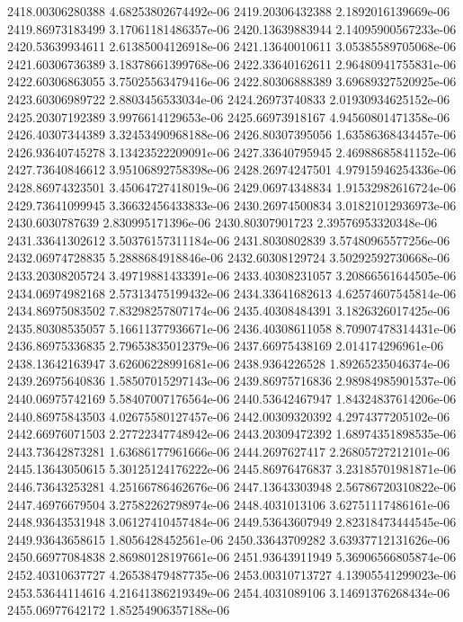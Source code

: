 {2418.00306280388 4.68253802674492e-06
2419.20306432388 2.1892016139669e-06
2419.86973183499 3.17061181486357e-06
2420.13639883944 2.14095900567233e-06
2420.53639934611 2.61385004126918e-06
2421.13640010611 3.05385589705068e-06
2421.60306736389 3.18378661399768e-06
2422.33640162611 2.96480941755831e-06
2422.60306863055 3.75025563479416e-06
2422.80306888389 3.69689327520925e-06
2423.60306989722 2.8803456533034e-06
2424.26973740833 2.01930934625152e-06
2425.20307192389 3.9976614129653e-06
2425.66973918167 4.94560801471358e-06
2426.40307344389 3.32453490968188e-06
2426.80307395056 1.63586368434457e-06
2426.93640745278 3.13423522209091e-06
2427.33640795945 2.46988685841152e-06
2427.73640846612 3.95106892758398e-06
2428.26974247501 4.97915946254336e-06
2428.86974323501 3.45064727418019e-06
2429.06974348834 1.91532982616724e-06
2429.73641099945 3.36632456433833e-06
2430.26974500834 3.01821012936973e-06
2430.6030787639 2.830995171396e-06
2430.80307901723 2.39576953320348e-06
2431.33641302612 3.50376157311184e-06
2431.8030802839 3.57480965577256e-06
2432.06974728835 5.2888684918846e-06
2432.60308129724 3.50292592730668e-06
2433.20308205724 3.49719881433391e-06
2433.40308231057 3.20866561644505e-06
2434.06974982168 2.57313475199432e-06
2434.33641682613 4.62574607545814e-06
2434.86975083502 7.83298257807174e-06
2435.40308484391 3.1826326017425e-06
2435.80308535057 5.16611377936671e-06
2436.40308611058 8.70907478314431e-06
2436.86975336835 2.79653835012379e-06
2437.66975438169 2.014174296961e-06
2438.13642163947 3.62606228991681e-06
2438.9364226528 1.89265235046374e-06
2439.26975640836 1.58507015297143e-06
2439.86975716836 2.98984985901537e-06
2440.06975742169 5.58407007176564e-06
2440.53642467947 1.84324837614206e-06
2440.86975843503 4.02675580127457e-06
2442.00309320392 4.2974377205102e-06
2442.66976071503 2.27722347748942e-06
2443.20309472392 1.68974351898535e-06
2443.73642873281 1.63686177961666e-06
2444.2697627417 2.26805727212101e-06
2445.13643050615 5.30125124176222e-06
2445.86976476837 3.23185701981871e-06
2446.73643253281 4.25166786462676e-06
2447.13643303948 2.56786720310822e-06
2447.46976679504 3.27582262798974e-06
2448.4031013106 3.62751117486161e-06
2448.93643531948 3.06127410457484e-06
2449.53643607949 2.82318473444545e-06
2449.93643658615 1.8056428452561e-06
2450.33643709282 3.63937712131626e-06
2450.66977084838 2.86980128197661e-06
2451.93643911949 5.36906566805874e-06
2452.40310637727 4.26538479487735e-06
2453.00310713727 4.13905541299023e-06
2453.53644114616 4.21641386219349e-06
2454.4031089106 3.14691376268434e-06
2455.06977642172 1.85254906357188e-06
}

